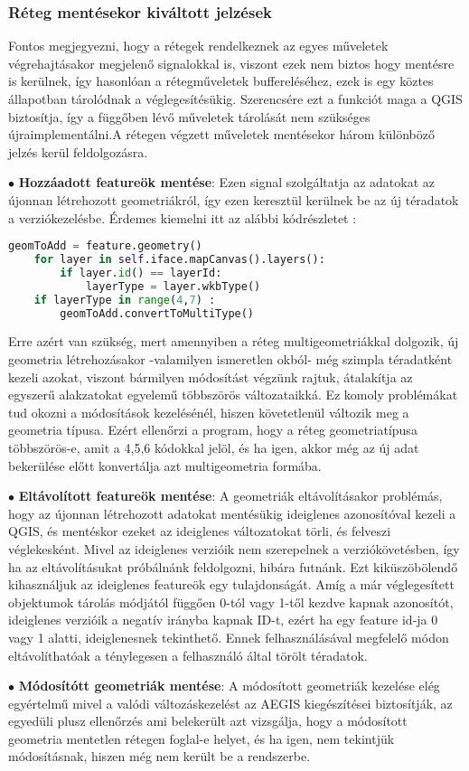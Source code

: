 \subsubsection{Réteg mentésekor kiváltott jelzések}
Fontos megjegyezni, hogy a rétegek rendelkeznek az egyes műveletek végrehajtásakor megjelenő signalokkal is, viszont ezek nem biztos hogy mentésre is kerülnek, így hasonlóan a rétegműveletek buffereléséhez, ezek is egy köztes állapotban tárolódnak a véglegesítésükig. Szerencsére ezt a funkciót maga a QGIS biztosítja, így a függőben lévő műveletek tárolását nem szükséges újraimplementálni.A rétegen végzett műveletek mentésekor három különböző jelzés kerül feldolgozásra.
\begin{list}{}{}
	\item $\bullet$ \textbf{Hozzáadott featureök mentése}: Ezen signal szolgáltatja az adatokat az újonnan létrehozott geometriákról, így ezen keresztül kerülnek be az új téradatok a verziókezelésbe. Érdemes kiemelni itt az alábbi kódrészletet : 
	\begin{lstlisting}[language={python}]
	geomToAdd = feature.geometry()
	for layer in self.iface.mapCanvas().layers():
		if layer.id() == layerId:
			layerType = layer.wkbType()
	if layerType in range(4,7) :
		geomToAdd.convertToMultiType()
	\end{lstlisting}
	Erre azért van szükség, mert amennyiben a réteg multigeometriákkal dolgozik, új geometria létrehozásakor -valamilyen ismeretlen okból- még szimpla téradatként kezeli azokat, viszont bármilyen módosítást végzünk rajtuk, átalakítja az egyszerű alakzatokat egyelemű többszörös változataikká. Ez komoly problémákat tud okozni a módosítások kezelésénél, hiszen követetlenül változik meg a geometria típusa. Ezért ellenőrzi a program, hogy a réteg geometriatípusa többszörös-e, amit a 4,5,6 kódokkal jelöl, és ha igen, akkor még az új adat bekerülése előtt konvertálja azt multigeometria formába.
	\item $\bullet$ \textbf{Eltávolított featureök mentése}: A geometriák eltávolításakor problémás, hogy az újonnan létrehozott adatokat mentésükig ideiglenes azonosítóval kezeli a QGIS, és mentéskor ezeket az ideiglenes változatokat törli, és felveszi véglekesként. Mivel az ideiglenes verzióik nem szerepelnek a verziókövetésben, így ha az eltávolításukat próbálnánk feldolgozni, hibára futnánk. Ezt kiküszöbölendő kihasználjuk az ideiglenes featureök egy tulajdonságát. Amíg a már véglegesített objektumok tárolás módjától függően 0-tól vagy 1-től kezdve kapnak azonosítót, ideiglenes verzióik a negatív irányba kapnak ID-t, ezért ha egy feature id-ja 0 vagy 1 alatti, ideiglenesnek tekinthető. Ennek felhasználásával megfelelő módon eltávolíthatóak a ténylegesen a felhasználó által törölt téradatok.
	\item $\bullet$ \textbf{Módosítótt geometriák mentése}: A módosított geometriák kezelése elég egyértelmű mivel a valódi változáskezelést az AEGIS kiegészítései biztosítják, az egyedüli plusz ellenőrzés ami belekerült azt vizsgálja, hogy a módosított geometria mentetlen rétegen foglal-e helyet, és ha igen, nem tekintjük módosításnak, hiszen még nem került be a rendszerbe.
\end{list}
